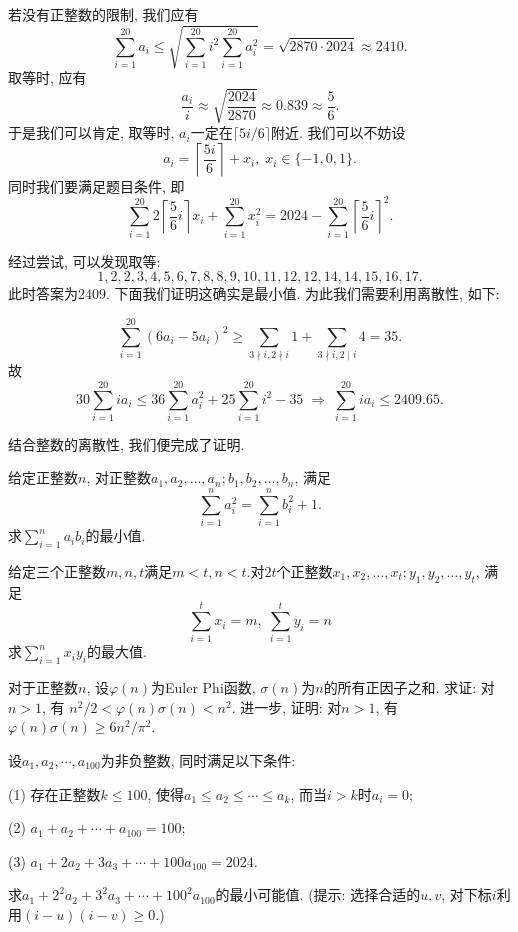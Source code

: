 \documentclass[lang=cn,12pt,thmcnt=section]{elegantbook}
\newcommand{\ce}[1]{\left\lceil #1\right\rceil}
\begin{document}
\begin{analysis}
若没有正整数的限制, 我们应有
\[\sum_{i=1}^{20}a_{i}\leq\sqrt{\sum_{i=1}^{20}i^2\sum_{i=1}^{20}a_{i}^{2}}=\sqrt{2870\cdot2024}\approx2410.\]
取等时, 应有
\[\frac{a_i}{i}\approx \sqrt{\frac{2024}{2870}}\approx0.839\approx\frac{5}{6}.\]
于是我们可以肯定, 取等时, $a_i$一定在$\lceil5i/6\rceil$附近. 我们可以不妨设
\[a_i=\left\lceil\frac{5i}{6}\right\rceil+x_i,\;x_i\in\{-1,0,1\}.\]
同时我们要满足题目条件, 即
\[\sum_{i=1}^{20}2\ce{\frac{5}{6}i}x_{i}+\sum_{i=1}^{20}x_{i}^{2}=2024-\sum_{i=1}^{20}\ce{\frac{5}{6}i}^{2}.\]\par
经过尝试, 可以发现取等:
\[1,2,2,3,4,5,6,7,8,8,9,10,11,12,12,14,14,15,16,17.\]
此时答案为$2409$. 下面我们证明这确实是最小值. 为此我们需要利用离散性, 如下:
\end{analysis}

\begin{solution}
\[\sum_{i=1}^{20}(6a_i-5a_i)^2\geq \sum_{3\nmid i,2\nmid i}1+\sum_{3\nmid i,2\mid i}4=35.\]
故
\[30\sum_{i=1}^{20}ia_{i}\leq36\sum_{i=1}^{20}a_{i}^{2}+25\sum_{i=1}^{20}i^{2}-35\;\Rightarrow\;\sum_{i=1}^{20}ia_{i}\leq2409.65.\]\par
结合整数的离散性, 我们便完成了证明.
\end{solution}

\exercisetitle

\begin{exercise}
给定正整数$n$, 对正整数$a_{1},a_{2},\ldots,a_{n};b_{1},b_{2},\ldots,b_{n}$, 满足
\[\sum_{i=1}^{n}a_{i}^{2}=\sum_{i=1}^{n}b_{i}^{2}+1.\]
求$\sum_{i=1}^{n}a_ib_i$的最小值.
\end{exercise}

\begin{exercise}
给定三个正整数$m,n,t$满足$m<t,n<t$.对$2t$个正整数$x_1,x_2,\ldots,x_t;y_1,y_2,\ldots,y_t$, 满足
\[\sum_{i=1}^{t}x_{i}=m,\;\sum_{i=1}^{t}y_{i}=n\]
求$\sum_{i=1}^nx_iy_i$的最大值.
\end{exercise}

\begin{exercise}
对于正整数$n$, 设$\varphi(n)$为Euler Phi函数, $\sigma(n)$为$n$的所有正因子之和. 求证: 对$n>1$, 有 $n^2/2<\varphi(n)\sigma(n)<n^2$. 进一步, 证明: 对$n>1$, 有$\varphi(n)\sigma(n)\geq6n^{2}/\pi^{2}$.
\end{exercise}

\begin{exercise}
设$a_1,a_2,\cdots,a_{100}$为非负整数, 同时满足以下条件:\par
(1) 存在正整数$k\le 100$, 使得$a_1\le a_2\le\cdots\le a_k$, 而当$i>k$时$a_i=0$;\par
(2) $a_1+a_2+\cdots+a_{100}=100$;\par
(3) $a_1+2a_2+3a_3+\cdots+100a_{100}=2024$.\par
求$a_1+2^2a_2+3^2a_3+\cdots+100^2a_{100}$的最小可能值. ({\kaishu 提示: 选择合适的$u,v$, 对下标$i$利用$(i-u)(i-v)\ge 0.$})
\end{exercise}
\end{document}

